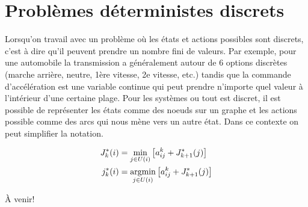 \newpage
\chapter{Problèmes déterministes discrets}
Lorsqu'on travail avec un problème où les états et actions possibles sont discrets, c'est à dire qu'il peuvent prendre un nombre fini de valeurs. Par exemple, pour une automobile la transmission a généralement autour de 6 options discrètes (marche arrière, neutre, 1ère vitesse, 2e vitesse, etc.) tandis que la commande d'accélération est une variable continue qui peut prendre n'importe quel valeur à l'intérieur d'une certaine plage. Pour les systèmes ou tout est discret, il est possible de représenter les états comme des noeuds sur un graphe et les actions possible comme des arcs qui nous mène vers un autre état. Dans ce contexte on peut simplifier la notation.


\begin{align}
J^*_k(i) &= 
\operatornamewithlimits{min}\limits_{j \in U(i)}
\left[
a_{ij}^k + J^*_{k+1}(j)
\right] \\
j^*_k(i) &= 
\operatornamewithlimits{argmin}\limits_{j \in U(i)}
\left[
a_{ij}^k + J^*_{k+1}(j)
\right] 
\label{eq:exactdpgraph}
\end{align} 

À venir!
